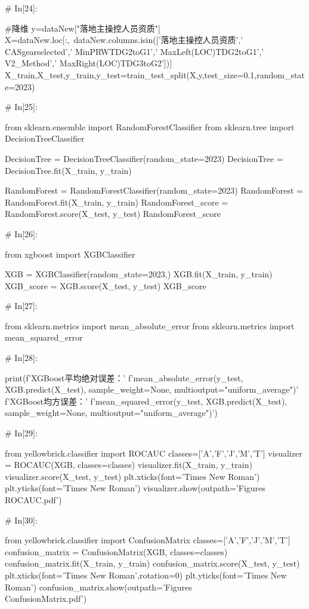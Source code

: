 \documentclass{MathorCupModeling}
\begin{document}
\begin{python}
# In[24]:


#降维
y=dataNew["落地主操控人员资质"]
X=dataNew.loc[:,~dataNew.columns.isin(['落地主操控人员资质',' CASgearselected',' MinPRWTDG2toG1',' MaxLeft(LOC)TDG2toG1',' V2_Method',' MaxRight(LOC)TDG3toG2'])]
X_train,X_test,y_train,y_test=train_test_split(X,y,test_size=0.1,random_state=2023)


# In[25]:


from sklearn.ensemble import RandomForestClassifier
from sklearn.tree import DecisionTreeClassifier

DecisionTree = DecisionTreeClassifier(random_state=2023)
DecisionTree = DecisionTree.fit(X_train, y_train)

RandomForest = RandomForestClassifier(random_state=2023)
RandomForest = RandomForest.fit(X_train, y_train)
RandomForest_score = RandomForest.score(X_test, y_test)
RandomForest_score


# In[26]:


from xgboost import XGBClassifier

XGB = XGBClassifier(random_state=2023,)
XGB.fit(X_train, y_train)
XGB_score = XGB.score(X_test, y_test)
XGB_score


# In[27]:


from sklearn.metrics import mean_absolute_error
from sklearn.metrics import mean_squared_error


# In[28]:


print(f'XGBoost平均绝对误差：'
      f'{mean_absolute_error(y_test, XGB.predict(X_test), sample_weight=None, multioutput="uniform_average")}\n'
      f'XGBoost均方误差：'
      f'{mean_squared_error(y_test, XGB.predict(X_test), sample_weight=None, multioutput="uniform_average")}')


# In[29]:


from yellowbrick.classifier import ROCAUC
classes=['A','F','J','M','T']
visualizer = ROCAUC(XGB, classes=classes)
visualizer.fit(X_train, y_train)
visualizer.score(X_test, y_test)
plt.xticks(font='Times New Roman')
plt.yticks(font='Times New Roman')
visualizer.show(outpath='Figures\\ROCAUC.pdf')


# In[30]:


from yellowbrick.classifier import ConfusionMatrix
classes=['A','F','J','M','T']
confusion_matrix = ConfusionMatrix(XGB, classes=classes)
confusion_matrix.fit(X_train, y_train)
confusion_matrix.score(X_test, y_test)
plt.xticks(font='Times New Roman',rotation=0)
plt.yticks(font='Times New Roman')
confusion_matrix.show(outpath='Figures\\ConfusionMatrix.pdf')



\end{python}
\end{document}

